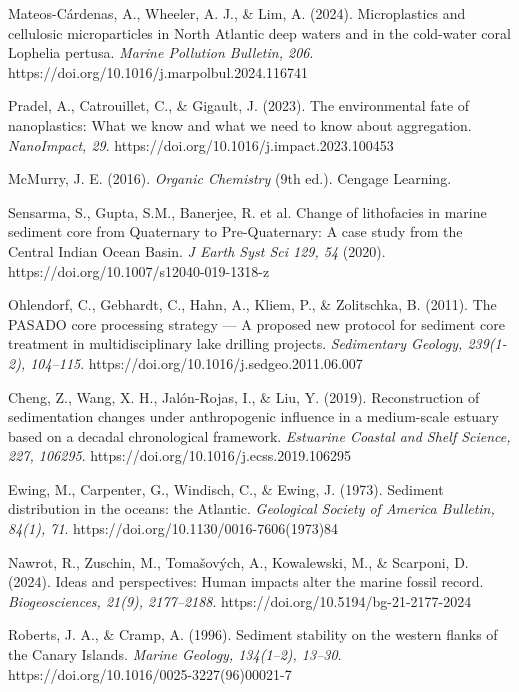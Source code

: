 \documentclass[twocolumn,a4paper,aps,amsmath,amssymb,floatfix,superscriptaddress]{revtex4-2}
\begin{document}
\begin{thebibliography}{99}
		Mateos-Cárdenas, A., Wheeler, A. J., \& Lim, A. (2024). Microplastics and cellulosic microparticles in North Atlantic deep waters and in the cold-water coral Lophelia pertusa. \textit{Marine Pollution Bulletin, 206}. https://doi.org/10.1016/j.marpolbul.2024.116741
		
		Pradel, A., Catrouillet, C., \& Gigault, J. (2023). The environmental fate of nanoplastics: What we know and what we need to know about aggregation. \textit{NanoImpact, 29}. https://doi.org/10.1016/j.impact.2023.100453
		
		McMurry, J. E. (2016). \textit{Organic Chemistry} (9th ed.). Cengage Learning.
		
		Sensarma, S., Gupta, S.M., Banerjee, R. et al. Change of lithofacies in marine sediment core from Quaternary to Pre-Quaternary: A case study from the Central Indian Ocean Basin. \textit{J Earth Syst Sci 129, 54} (2020). https://doi.org/10.1007/s12040-019-1318-z 
		
		Ohlendorf, C., Gebhardt, C., Hahn, A., Kliem, P., \& Zolitschka, B. (2011). The PASADO core processing strategy — A proposed new protocol for sediment core treatment in multidisciplinary lake drilling projects. \textit{Sedimentary Geology, 239(1-2), 104–115}. https://doi.org/10.1016/j.sedgeo.2011.06.007
		
		Cheng, Z., Wang, X. H., Jalón-Rojas, I., \& Liu, Y. (2019). Reconstruction of sedimentation changes under anthropogenic influence in a medium-scale estuary based on a decadal chronological framework. \textit{Estuarine Coastal and Shelf Science, 227, 106295}. https://doi.org/10.1016/j.ecss.2019.106295
		
		 Ewing, M., Carpenter, G., Windisch, C., \& Ewing, J. (1973). Sediment distribution in the oceans: the Atlantic. \textit{Geological Society of America Bulletin, 84(1), 71}. https://doi.org/10.1130/0016-7606(1973)84
		
		Nawrot, R., Zuschin, M., Tomašových, A., Kowalewski, M., \& Scarponi, D. (2024). Ideas and perspectives: Human impacts alter the marine fossil record. \textit{Biogeosciences, 21(9), 2177–2188}. https://doi.org/10.5194/bg-21-2177-2024
		
		 Roberts, J. A., \& Cramp, A. (1996). Sediment stability on the western flanks of the Canary Islands. \textit{Marine Geology, 134(1–2), 13–30}. https://doi.org/10.1016/0025-3227(96)00021-7
		

\end{thebibliography}
\end{document}
